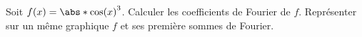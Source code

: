 \begin{enonce}
\begin{exercise}[ID={RMS 124 1296},subtitle={Maple},tags={}, difficulty={0}]
  Soit $f(x)=\abs*{\cos(x)}^3$.
  Calculer les coefficients de Fourier de $f$.
  Représenter sur un même graphique $f$ et ses première sommes de Fourier.
\end{exercise}
\begin{solution}
\end{solution}
\end{enonce}
